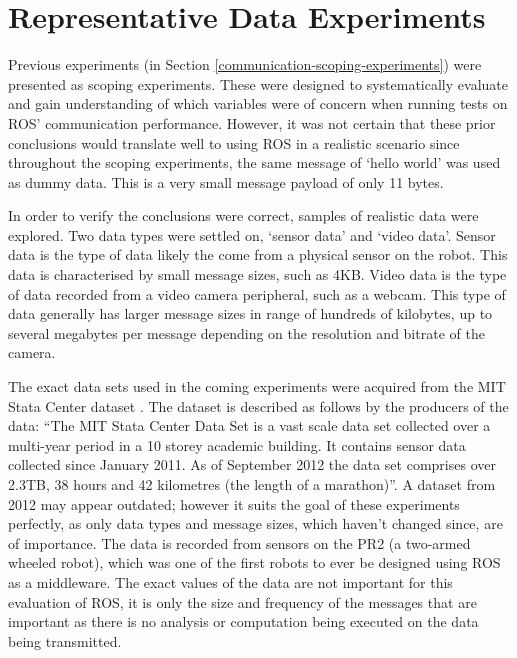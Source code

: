 \documentclass{l4proj}
\begin{document}








\section{Representative Data Experiments}
\label{communication-real-data}

Previous experiments (in Section \ref{communication-scoping-experiments}) were presented as scoping experiments. These were designed to systematically evaluate and gain understanding of which variables were of concern when running tests on ROS' communication performance. However, it was not certain that these prior conclusions would translate well to using ROS in a realistic scenario since throughout the scoping experiments, the same message of `hello world' was used as dummy data. This is a very small message payload of only 11 bytes.

In order to verify the conclusions were correct, samples of realistic data were explored. Two data types were settled on, `sensor data' and `video data'. Sensor data is the type of data likely the come from a physical sensor on the robot. This data is characterised by small message sizes, such as 4KB. Video data is the type of data recorded from a video camera peripheral, such as a webcam. This type of data generally has larger message sizes in range of hundreds of kilobytes, up to several megabytes per message depending on the resolution and bitrate of the camera.

The exact data sets used in the coming experiments were acquired from the MIT Stata Center dataset \cite{mit-stata-center-dataset}. The dataset is described as follows by the producers of the data: ``The MIT Stata Center Data Set is a vast scale data set collected over a multi-year period in a 10 storey academic building. It contains sensor data collected since January 2011. As of September 2012 the data set comprises over 2.3TB, 38 hours and 42 kilometres (the length of a marathon)''\cite{mit-stata-center-dataset}. A dataset from 2012 may appear outdated; however it suits the goal of these experiments perfectly, as only data types and message sizes, which haven't changed since, are of importance. The data is recorded from sensors on the PR2 (a two-armed wheeled robot), which was one of the first robots to ever be designed using ROS as a middleware. The exact values of the data are not important for this evaluation of ROS, it is only the size and frequency of the messages that are important as there is no analysis or computation being executed on the data being transmitted.
\end{document}
